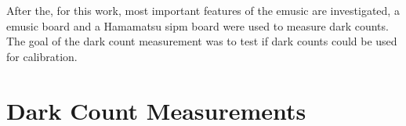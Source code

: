 After the, for this work, most important features of the \ac{emusic} are investigated, a \ac{emusic} board and a Hamamatsu \ac{sipm} board were used to measure dark counts.
The goal of the dark count measurement was to test if dark counts could be used for calibration.

\section{Dark Count Measurements}

